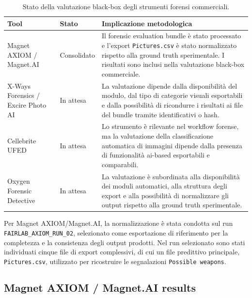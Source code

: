 \begin{table}[H]
\centering
\caption{Stato della valutazione black-box degli strumenti forensi commerciali.}
\label{tab:results-commercial-tool-status}
\small
\begin{tabularx}{\textwidth}{@{}l l X@{}}
\toprule
\textbf{Tool} & \textbf{Stato} & \textbf{Implicazione metodologica} \\
\midrule

Magnet AXIOM / Magnet.AI
&
Consolidato
&
Il forensic evaluation bundle è stato processato e l'export \texttt{Pictures.csv}
è stato normalizzato rispetto alla ground truth sperimentale. I risultati sono
inclusi nella valutazione black-box commerciale. \\

X-Ways Forensics / Excire Photo AI
&
In attesa
&
La valutazione dipende dalla disponibilità del modulo, dal tipo di categorie
visuali esportabili e dalla possibilità di ricondurre i risultati ai file del
bundle tramite identificativi o hash. \\

Cellebrite UFED
&
In attesa
&
Lo strumento è rilevante nel workflow forense, ma la valutazione della
classificazione automatica di immagini dipende dalla presenza di funzionalità
\gls{ai}-based esportabili e comparabili. \\

Oxygen Forensic Detective
&
In attesa
&
La valutazione è subordinata alla disponibilità dei moduli automatici, alla
struttura degli export e alla possibilità di normalizzare gli output rispetto
alla ground truth sperimentale. \\

\bottomrule
\end{tabularx}
\end{table}

Per Magnet AXIOM/Magnet.AI, la normalizzazione è stata condotta sul run
\texttt{FAIRLAB\_AXIOM\_RUN\_02}, selezionato come esportazione di riferimento
per la completezza e la consistenza degli output prodotti. Nel run selezionato
sono stati individuati cinque file di export complessivi, di cui un file
predittivo principale, \texttt{Pictures.csv}, utilizzato per ricostruire le
segnalazioni \texttt{Possible weapons}.


\subsection{Magnet AXIOM / Magnet.AI results}
\label{subsec:results-magnet}


